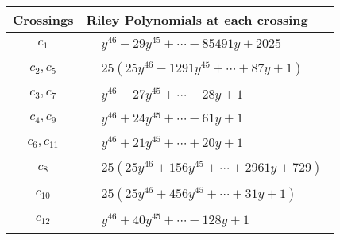 \documentclass[1p]{elsarticle_modified}
\theoremstyle{definition}
\begin{document}
\begin{tabular}{m{50pt}|m{274pt}}
Crossings & \hspace{64pt}Riley Polynomials at each crossing \\
\hline $$\begin{aligned}c_{1}\end{aligned}$$&$\begin{aligned}
&y^{46}-29 y^{45}+\cdots-85491 y+2025
\end{aligned}$\\
\hline $$\begin{aligned}c_{2},c_{5}\end{aligned}$$&$\begin{aligned}
&25(25 y^{46}-1291 y^{45}+\cdots+87 y+1)
\end{aligned}$\\
\hline $$\begin{aligned}c_{3},c_{7}\end{aligned}$$&$\begin{aligned}
&y^{46}-27 y^{45}+\cdots-28 y+1
\end{aligned}$\\
\hline $$\begin{aligned}c_{4},c_{9}\end{aligned}$$&$\begin{aligned}
&y^{46}+24 y^{45}+\cdots-61 y+1
\end{aligned}$\\
\hline $$\begin{aligned}c_{6},c_{11}\end{aligned}$$&$\begin{aligned}
&y^{46}+21 y^{45}+\cdots+20 y+1
\end{aligned}$\\
\hline $$\begin{aligned}c_{8}\end{aligned}$$&$\begin{aligned}
&25(25 y^{46}+156 y^{45}+\cdots+2961 y+729)
\end{aligned}$\\
\hline $$\begin{aligned}c_{10}\end{aligned}$$&$\begin{aligned}
&25(25 y^{46}+456 y^{45}+\cdots+31 y+1)
\end{aligned}$\\
\hline $$\begin{aligned}c_{12}\end{aligned}$$&$\begin{aligned}
&y^{46}+40 y^{45}+\cdots-128 y+1
\end{aligned}$\\
\hline
\end{tabular}\\~\\
\end{document}
